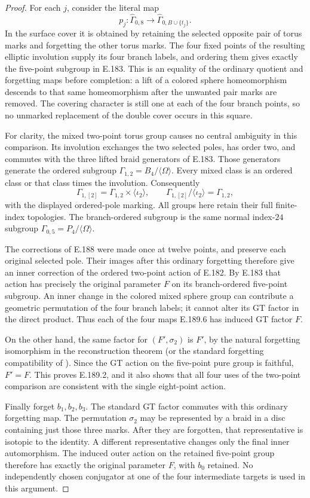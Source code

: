 \begin{proof}
For each \(j\), consider the literal map
\[
 p_j:\widehat\Gamma_{0,8}
                 \longrightarrow
       \widehat\Gamma_{0,B\cup\{t_j\}}.
\tag{E.189.6}
\]
In the surface cover it is obtained by retaining the
selected opposite pair of torus marks and forgetting
the other torus marks.  The four fixed points of the
resulting elliptic involution supply its four branch
labels, and ordering them gives exactly the
five-point subgroup in E.183.
This is an equality of the ordinary quotient and
forgetting maps before completion: a lift of a colored
sphere homeomorphism descends to that same homeomorphism
after the unwanted pair marks are removed.
The covering character is still one at each of the
four branch points, so no unmarked replacement of the
double cover occurs in this square.

For clarity, the mixed two-point torus group causes no
central ambiguity in this comparison.  Its involution
exchanges the two selected poles, has order two, and
commutes with the three lifted braid generators of
E.183.  Those generators generate the ordered subgroup
\(\Gamma_{1,2}=B_4/\langle\Omega\rangle\).
Every mixed class is an ordered class or that class
times the involution.  Consequently
\[
 \Gamma_{1,[2]}=\Gamma_{1,2}\times\langle\iota_2\rangle,
 \qquad
 \Gamma_{1,[2]}/\langle\iota_2\rangle=\Gamma_{1,2},
\tag{E.189.7}
\]
with the displayed ordered-pole marking.
All groups here retain their full finite-index
topologies.  The branch-ordered subgroup is the
same normal index-\(24\) subgroup
\(\Gamma_{0,5}=P_4/\langle\Omega\rangle\).

The corrections of E.188 were made once at twelve
points, and preserve each original selected pole.
Their images after this ordinary forgetting therefore
give an inner correction of the ordered two-point
action of E.182.  By E.183 that action has precisely
the original parameter \(F\) on its branch-ordered
five-point subgroup.  An inner change in the colored
mixed sphere group can contribute a geometric
permutation of the four branch labels; it cannot
alter its GT factor in the direct product.
Thus each of the four maps E.189.6 has induced GT
factor \(F\).

On the other hand, the same factor for \((F',\sigma_2)\)
is \(F'\), by the natural forgetting isomorphism
in the reconstruction theorem (or the standard
forgetting compatibility of
\cite[\S3.1, Lemma 1(c), author p.30]{SymHarbaterSchneps2000}).
Since the GT action on the five-point pure group is
faithful, \(F'=F\).  This proves E.189.2, and it also
shows that all four uses of the two-point comparison
are consistent with the single eight-point action.

Finally forget \(b_1,b_2,b_3\).
The standard GT factor commutes with this ordinary
forgetting map.  The permutation \(\sigma_2\) may be
represented by a braid in a disc containing just
those three marks.  After they are forgotten, that
representative is isotopic to the identity.  A
different representative changes only the final
inner automorphism.  The induced outer action on
the retained five-point group therefore has exactly
the original parameter \(F\), with \(b_0\) retained.
No independently chosen conjugator at one of the
four intermediate targets is used in this argument.
\end{proof}
